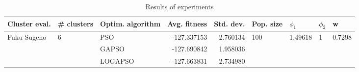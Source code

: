 \begin{table}
\centering
\caption{Results of experiments}
\begin{tabular}{lllrrllll}
\toprule
               Cluster eval. &        \# clusters & Optim. algorithm &  Avg. fitness &  Std. dev. &            Pop. size &               $\phi_{1}$ &         $\phi_{2}$ &                       w \\
\midrule
\multirow{3}{*}{Fuku Sugeno} & \multirow{3}{*}{6} &              PSO &   -127.337153 &   2.760134 & \multirow{3}{*}{100} & \multirow{3}{*}{1.49618} & \multirow{3}{*}{1} & \multirow{3}{*}{0.7298} \\
                             &                    &            GAPSO &   -127.690842 &   1.958036 &                      &                          &                    &                         \\
                             &                    &          LOGAPSO &   -127.663831 &   2.734980 &                      &                          &                    &                         \\
\bottomrule
\end{tabular}
\end{table}
